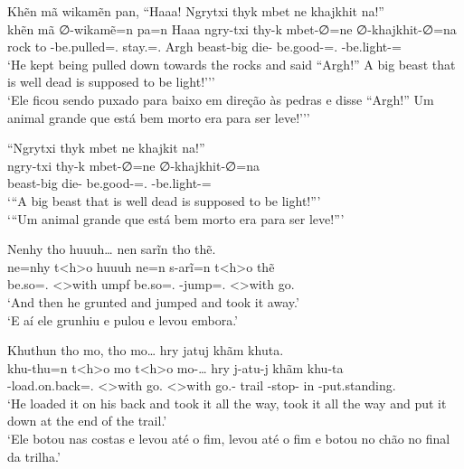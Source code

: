 \documentclass[output=paper,
modfonts,nonflat
]{langsci/langscibook}
\begin{document}
\newpage
\ea  Khẽn mã wikamẽn pan, ``Haaa! Ngrytxi thyk mbet ne khajkhit na!'' \\[.3em]
\gll khẽn mã ∅-wikamẽ=n                  pa=n                Haaa ngry-txi  thy-k       mbet-∅=ne                  ∅-khajkhit-∅=na                  \\
     rock to \Third-be.pulled=\AAnd.\Ss{} stay.\Pl=\AAnd.\Ss{} Argh beast-big die-\Nmlz{} be.good-\Nmlz{}=\AAnd.\Ss{} \Third-be.light-\Nmlz{}=\N\Fut{} \\
\glt `He kept being pulled down towards the rocks and said ``Argh!'' A big beast that is well dead is supposed to be light!''{}' \\
     `Ele ficou sendo puxado para baixo em direção às pedras e disse ``Argh!'' Um animal grande que está bem morto era para ser leve!''{}' \\
\z

\ea  ``Ngrytxi thyk mbet ne khajkit na!'' \\[.3em]
\gll ngry-txi  thy-k       mbet-∅=ne                  ∅-khajkhit-∅=na                  \\
     beast-big die-\Nmlz{} be.good-\Nmlz{}=\AAnd.\Ss{} \Third-be.light-\Nmlz{}=\N\Fut{} \\
\glt `{}``A big beast that is well dead is supposed to be light!''{}' \\
     `{}``Um animal grande que está bem morto era para ser leve!''{}' \\
\z

\ea  Nenhy tho huuuh\ldots{} nen sarĩn tho thẽ. \\[.3em]
\gll ne=nhy           t<h>o        huuuh ne=n             s-arĩ=n                t<h>o        thẽ      \\
     be.so=\AAnd.\Ds{} <\Third>with umpf  be.so=\AAnd.\Ss{} \Third-jump=\AAnd.\Ss{} <\Third>with go.\Sg{} \\
\glt `And then he grunted and jumped and took it away.' \\
     `E aí ele grunhiu e pulou e levou embora.' \\
\z

\ea  Khuthun tho mo, tho mo\ldots{} hry jatuj khãm khuta. \\[.3em]
\gll khu-thu=n                      t<h>o        mo       t<h>o        mo-\ldots{}       hry   j-atu-j         khãm khu-ta                    \\
     \Third-load.on.back=\AAnd.\Ss{} <\Third>with go.\Pl{} <\Third>with go.\Pl{}-\Ints{} trail \E-stop-\Nmlz{} in   \Third-put.standing.\Sg{} \\
\glt `He loaded it on his back and took it all the way, took it all the way and put it down at the end of the trail.' \\
     `Ele botou nas costas e levou até o fim, levou até o fim e botou no chão no final da trilha.' \\
\z
\end{document}
